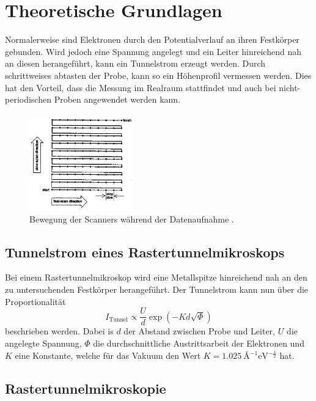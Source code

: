 \section{Theoretische Grundlagen}
\label{sec:theoretische_grundlagen}

Normalerweise sind Elektronen durch den Potentialverlauf an ihren Festkörper gebunden.
Wird jedoch eine Spannung angelegt und ein Leiter hinreichend nah an diesen herangeführt, kann ein Tunnelstrom erzeugt werden.
Durch schrittweises abtasten der Probe, kann so ein Höhenprofil vermessen werden.
Dies hat den Vorteil, dass die Messung im Realraum stattfindet und auch bei nicht-periodischen Proben angewendet werden kann.
\begin{figure}[!h]
    \centering
    \includegraphics[width=0.4\textwidth]{images/scanning.jpg}
    \caption{Bewegung der Scanners während der Datenaufnahme \cite{STM-Literatur}.}
\end{figure}

\subsection{Tunnelstrom eines Rastertunnelmikroskops} %
\label{sub:tunnelstrom}

Bei einem Rastertunnelmikroskop wird eine Metallspitze hinreichend nah an den zu untersuchenden Festkörper herangeführt.
Der Tunnelstrom kann nun über die Proportionalität
\begin{equation}
    I_\text{Tunnel} \propto \frac{U}{d} \exp{\left( - K d \sqrt{\Phi} \right)} \label{eqn:tunnelstrom}
\end{equation}
beschrieben werden.
Dabei is $d$ der Abstand zwischen Probe und Leiter, $U$ die angelegte Spannung, $\Phi$ die durchschnittliche Austrittsarbeit der Elektronen und $K$ eine Konstante, welche für das Vakuum den Wert $K = \SI{1,025}{\angstrom^{-1} \electronvolt^{-\frac{1}{2}}}$ hat.

\subsection{Rastertunnelmikroskopie} %
\label{sub:rastertunnelmikroskopie}


